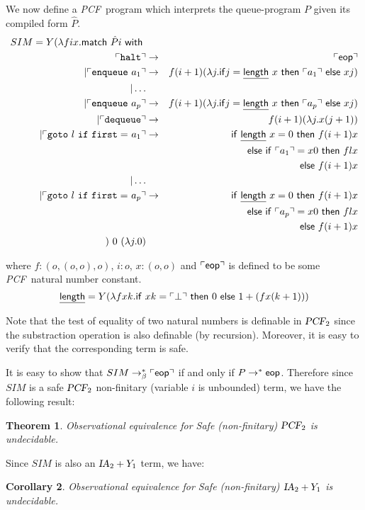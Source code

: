 \documentclass{article}
\newcommand\eop{{\sf eop}}
\newcommand{\betared}{\rightarrow_\beta}
\newcommand{\encode}[1]{\ulcorner #1 \urcorner}
\newcommand\ialgol{{\textsl{IA}}}
\newcommand\pcf{\textsl{PCF}}
\newtheorem{theorem}{Theorem}[section]
\newtheorem{corollary}[theorem]{Corollary}
\begin{document}
We now define a \pcf\ program which interprets the queue-program $P$ given  its compiled form $\hat{P}$.
\begin{eqnarray*}
SIM = Y ( \lambda f i x . {\sf match\ } \hat{P} i  {\sf \ with\ }   \\
 \encode{ \tt halt }&\rightarrow& \encode{\eop} \\
| \encode{ {\tt enqueue\ } a_1 } &\rightarrow& f (i+1) ( \lambda j . {\sf if} j = \underline{\sf length}\ x\ {\sf then\ } \encode{a_1} {\sf\ else\ } x j ) \\
| \ldots \\
| \encode{ {\tt enqueue\ } a_p } &\rightarrow& f (i+1) ( \lambda j . {\sf if} j = \underline{\sf length}\ x\ {\sf then\ } \encode{a_p} {\sf\ else\ } x j ) \\
| \encode{ {\tt dequeue } } &\rightarrow& f (i+1) (\lambda j . x (j+1) ) \\
| \encode{ {\tt goto\ } l {\tt\ if\ first=\ } a_1 } &\rightarrow&  
{\sf if\ } \underline{\sf length}\ x = 0 {\ \sf then\ } f (i+1) x \\
&&{\sf else\ if\ } \encode{a_1} = x 0 {\sf\ then\ } f l x \\
&&{\sf else\ } f (i+1) x \\
| \ldots \\
| \encode{{\tt goto\ } l {\tt\ if\ first=\ } a_p} &\rightarrow&  
{\sf if\ } \underline{\sf length}\ x = 0 {\ \sf then\ } f (i+1) x \\
&&{\sf else\ if\ } \encode{a_p} = x 0 {\sf\ then\ } f l x \\
&&{\sf else\ } f (i+1) x \\
)\ 0\ (\lambda j . 0)
\end{eqnarray*}

where $f: (o,(o,o),o)$, $i:o$, $x:(o,o)$ and $\encode{\eop}$ is defined to be some \pcf\ natural number constant.
$$ \underline{\sf  length}  = Y( \lambda f x k . {\sf if\ } x k = \encode{\bot} {\sf\ then\ } 0 {\sf\ else\ } 1 + (f x (k+1)))$$

Note that the test of equality of two natural numbers is definable in $\pcf_2$ since the substraction operation is  also definable (by recursion). Moreover, it is easy to verify that the corresponding term is safe.


It is easy to show that $SIM \betared^* \encode{\eop}$ if and only if $P \rightarrow^* \eop$. Therefore since $SIM$ is a safe $\pcf_2$ 
non-finitary (variable $i$ is unbounded) term, we have the following result:
\begin{theorem}
Observational equivalence for Safe (non-finitary) $\pcf_2$ is undecidable.
\end{theorem}
Since $SIM$ is also an $\ialgol_2 + Y_1$ term, we have:
\begin{corollary}
Observational equivalence for Safe (non-finitary) $\ialgol_2 + Y_1$ is undecidable.
\end{corollary}
\end{document}
